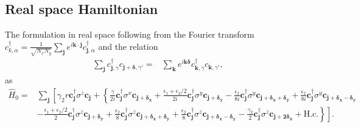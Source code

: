 \documentclass[aps,prb,amsmath,amssymb,twocolumn, superscriptaddress]{revtex4-2}
\begin{document}
\subsection{Real space Hamiltonian}
The formulation in real space following from the Fourier transform $c_{k, \alpha}^\dagger = \frac{1}{\sqrt{N_x N_y}} \sum_{\bm j} e^{i \bm k \cdot \bm j} c_{\bm j , \alpha}^\dagger$ and the relation 
\begin{align}
\sum_{\bm j } c^\dagger_{\bm{j}, \gamma} c_{\bm{j} + \bm \delta, \gamma'} =& \sum_{\bm k} e^{i \bm k \bm \delta} c^\dagger_{\bm k, \gamma} c_{\bm k, \gamma'},
\end{align}
as
\begin{align}
\hat H_{0} = & \sum_{\bm j} \left [\gamma_2 r \bm c_{\bm{j}}^\dagger \sigma^z \bm c_{\bm{j }} + \left \{\frac{\gamma}{2i} \bm c_{\bm{j}}^\dagger \sigma^x \bm c_{\bm{j + \delta_x}} + \frac{\epsilon_1 + \epsilon_2 / 2}{2i} \bm c_{\bm{j}}^\dagger \sigma^y \bm c_{\bm{j + \delta_y}}  - \frac{\epsilon_2}{8i} \bm c_{\bm{j}}^\dagger \sigma^y \bm c_{\bm{j + \delta_x + \delta_y}}  + \frac{\epsilon_2}{8i} \bm c_{\bm{j}}^\dagger \sigma^y \bm c_{\bm{j + \delta_x - \delta_y}} \right. \right. \nonumber \\
& - \left. \left. \frac{\epsilon_1 + \epsilon_2 / 2}{2} \bm c_{\bm{j}}^\dagger \sigma^z \bm c_{\bm{j  + \delta_y}} + \frac{\epsilon_2}{8} \bm c_{\bm{j}}^\dagger \sigma^z \bm c_{\bm{j  + \delta_x + \delta_y}} +  \frac{\epsilon_2}{8} \bm c_{\bm{j}}^\dagger \sigma^z \bm c_{\bm{j  + \delta_x - \delta_y}} - \frac{\gamma_2}{2} \bm c_{\bm{j}}^\dagger \sigma^z \bm c_{\bm{j  + 2 \delta_x}} + \text{H.c.}\right\} \right ].
\end{align}
\end{document}
